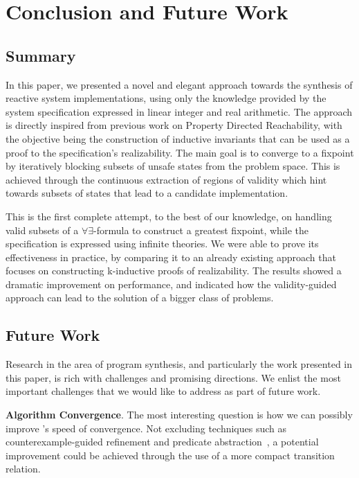 \section{Conclusion and Future Work}
\label{sec:conclusion}

\subsection{Summary}

In this paper, we presented a novel and elegant approach towards the synthesis
of reactive system implementations, using only the knowledge provided by the
system specification expressed in linear integer and real arithmetic. The approach is
directly inspired from previous work on Property Directed Reachability, with the objective being the construction of inductive
invariants that can be used as a proof to the specification's realizability. The
main goal is to converge to a fixpoint by iteratively blocking subsets of
unsafe states from the problem space. This is achieved through the continuous
extraction of regions of validity which hint towards subsets of states that
lead to a candidate implementation.

This is the first complete attempt, to the best of our knowledge, on handling
valid subsets of a $\forall\exists$-formula to construct a greatest fixpoint,
while the specification is expressed using infinite theories. We were able to
prove its effectiveness in practice, by comparing it to an already existing
approach that focuses on constructing k-inductive proofs of realizability. The
results showed a dramatic improvement on performance, and indicated how the
validity-guided approach can lead to the solution of a bigger class of problems.

\subsection{Future Work}
Research in the area of program synthesis, and particularly the work presented in this paper, is rich with challenges and promising directions. We enlist the most important challenges that we would like to address as part of future work.

\textbf{Algorithm Convergence}. The most interesting question is how we can possibly improve \jsynvg's
speed of convergence. Not excluding techniques such as counterexample-guided
refinement and predicate abstraction~\cite{walker2014predicate}, a potential
improvement could be achieved through the use of a more compact transition
relation. 

